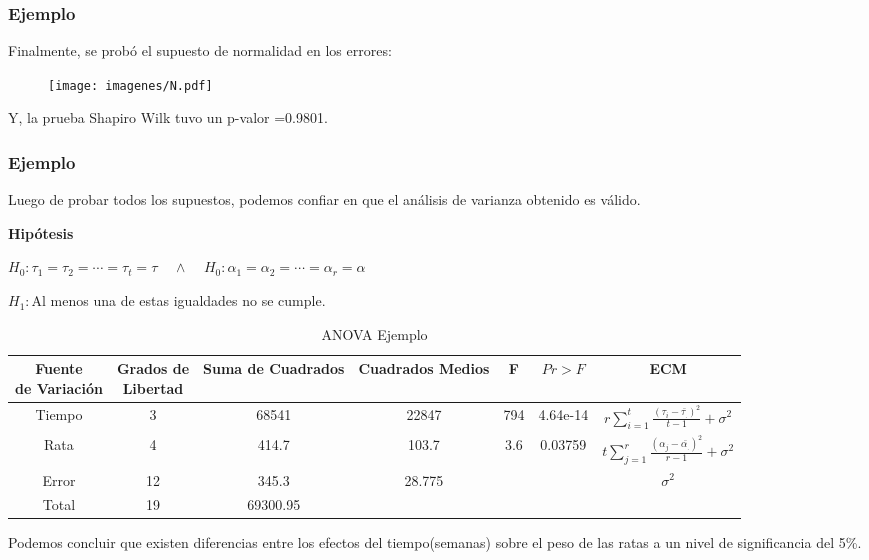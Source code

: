 \documentclass[12pt]{beamer}
\begin{document}
\begin{frame}
\frametitle{Ejemplo}
Finalmente, se probó el supuesto de normalidad en los errores:
\begin{figure}[h!]
  \centering
  \texttt{[image: imagenes/N.pdf]}
\end{figure}
Y, la prueba Shapiro Wilk tuvo un p-valor =0.9801.
\end{frame}

\begin{frame}
\frametitle{Ejemplo}
Luego de probar todos los supuestos, podemos confiar en que el análisis de varianza obtenido es válido.

\textbf{Hipótesis}
\begin{center}
$H_0:\tau_1=\tau_2=\cdots=\tau_t=\tau \;\;\;\; \wedge \;\;\;\; H_0:\alpha_1=\alpha_2=\cdots=\alpha_r=\alpha $

$H_1:$Al menos una de estas igualdades no se cumple.
\end{center}
\begin{table}[htbp]
  \centering
\resizebox{10cm}{!} {
\begin{tabular}{|c|c|c|c|c|c|c|}
\hline 
\parbox{7em}{\centering Fuente\\ de Variación} & \parbox{7em}{\centering Grados de\\ Libertad} & Suma de Cuadrados & Cuadrados Medios & F & $Pr>F$ & ECM \\ 
\hline 
Tiempo & 3 & 68541 & 22847 & 794 & 4.64e-14  & $r\sum\limits_{i=1}^{t}\frac{(\tau_i-\bar{\tau_{.}})^2}{t-1}+\sigma^2$\\ 
Rata & 4 & 414.7 & 103.7 & 3.6 & 0.03759 &$t\sum\limits_{j=1}^{r}\frac{(\alpha_{j}-\bar{\alpha_{.}})^2}{r-1}+\sigma^2$ \\
Error & 12 & 345.3 & 28.775 &   & & $\sigma^2$\\ 
Total & 19 & 69300.95 &  &   & &\\ 
\hline 
\end{tabular} 
}
\caption{ANOVA Ejemplo}
\label{tab:addlabel}%
\end{table}%
Podemos concluir que existen diferencias entre los efectos del tiempo(semanas) sobre el peso de las ratas a un nivel de
significancia del 5\%.
\end{frame}
\end{document}
